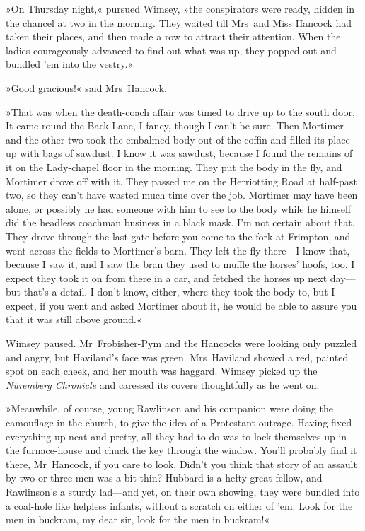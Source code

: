 »On Thursday night,« pursued Wimsey, »the conspirators were ready, hidden in the chancel at two in the morning. They waited till Mrs~and Miss Hancock had taken their places, and then made a row to attract their attention. When the ladies courageously advanced to find out what was up, they popped out and bundled 'em into the vestry.«

»Good gracious!« said Mrs~Hancock.

»That was when the death-coach affair was timed to drive up to the south door. It came round the Back Lane, I fancy, though I can't be sure. Then Mortimer and the other two took the embalmed body out of the coffin and filled its place up with bags of sawdust. I know it was sawdust, because I found the remains of it on the Lady-chapel floor in the morning. They put the body in the fly, and Mortimer drove off with it. They passed me on the Herriotting Road at half-past two, so they can't have wasted much time over the job. Mortimer may have been alone, or possibly he had someone with him to see to the body while he himself did the headless coachman business in a black mask. I'm not certain about that. They drove through the last gate before you come to the fork at Frimpton, and went across the fields to Mortimer's barn. They left the fly there—I know that, because I saw it, and I saw the bran they used to muffle the horses' hoofs, too. I expect they took it on from there in a car, and fetched the horses up next day—but that's a detail. I don't know, either, where they took the body to, but I expect, if you went and asked Mortimer about it, he would be able to assure you that it was still above ground.«

Wimsey paused. Mr~Frobisher-Pym and the Hancocks were looking only puzzled and angry, but Haviland's face was green. Mrs~Haviland showed a red, painted spot on each cheek, and her mouth was haggard. Wimsey picked up the \textit{Nüremberg Chronicle} and caressed its covers thoughtfully as he went on.

»Meanwhile, of course, young Rawlinson and his companion were doing the camouflage in the church, to give the idea of a Protestant outrage. Having fixed everything up neat and pretty, all they had to do was to lock themselves up in the furnace-house and chuck the key through the window. You'll probably find it there, Mr~Hancock, if you care to look. Didn't you think that story of an assault by two or three men was a bit thin? Hubbard is a hefty great fellow, and Rawlinson's a sturdy lad—and yet, on their own showing, they were bundled into a coal-hole like helpless infants, without a scratch on either of 'em. Look for the men in buckram, my dear sir, look for the men in buckram!«

